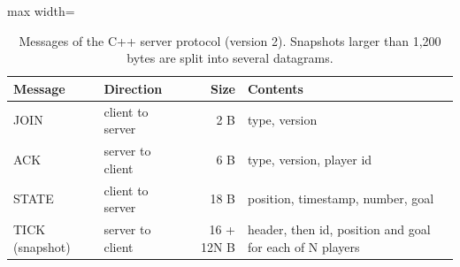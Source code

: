 \IfFileExists{IEEEtran.cls}{\ieeetrue\documentclass[conference]{IEEEtran}}{\ieeefalse\documentclass[twocolumn,10pt]{article}}
\begin{document}

\begin{table}[H]
\caption{Messages of the C++ server protocol (version 2). Snapshots larger than 1,200 bytes are split into several datagrams.}
\label{tab:packets}
\centering
\footnotesize
\begin{adjustbox}{max width=\columnwidth}\begin{tabular}{@{}llrl@{}}
\toprule
Message & Direction & Size & Contents \\
\midrule
JOIN & client to server & 2 B & type, version \\
ACK & server to client & 6 B & type, version, player id \\
STATE & client to server & 18 B & position, timestamp, number, goal \\
TICK (snapshot) & server to client & 16 + 12N B & header, then id, position and goal for each of N players \\
\bottomrule
\end{tabular}\end{adjustbox}
\end{table}
\end{document}
